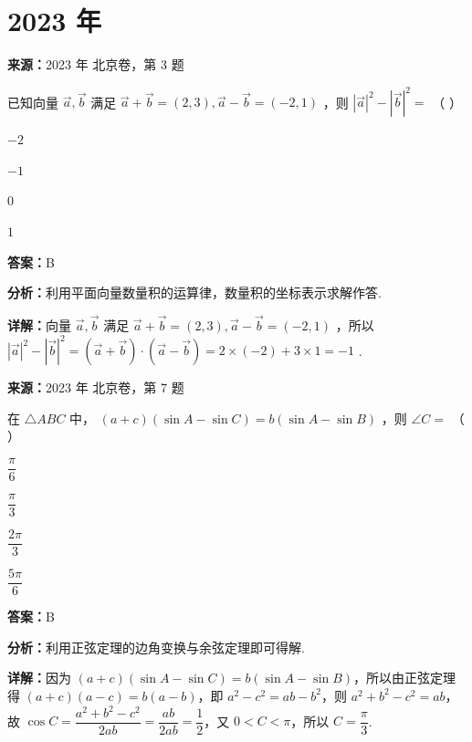 \section*{2023 年}

\begin{question}[points=4]
\textbf{来源：}2023 年 北京卷，第 3 题\par
已知向量 $\vec{a}, \vec{b}$ 满足 $\vec{a} + \vec{b} = (2,3), \vec{a} - \vec{b} = (-2,1)$ ，则 $|\vec{a}|^2 - |\vec{b}|^2 =$ （ ）
\begin{choices}
  \item $-2$
  \item $-1$
  \item $0$
  \item $1$
\end{choices}
\begin{solution}
\textbf{答案：}B

\textbf{分析：}利用平面向量数量积的运算律，数量积的坐标表示求解作答.

\textbf{详解：}向量 $\vec{a}, \vec{b}$ 满足 $\vec{a} + \vec{b} = (2,3), \vec{a} - \vec{b} = (-2,1)$ ，所以 $|\vec{a}|^2 - |\vec{b}|^2 = (\vec{a}+\vec{b})\cdot(\vec{a}-\vec{b}) = 2\times(-2) + 3\times1 = -1$ .
\end{solution}
\end{question}

\begin{question}[points=4]
\textbf{来源：}2023 年 北京卷，第 7 题\par
在 $\triangle ABC$ 中， $(a+c)(\sin A - \sin C) = b(\sin A - \sin B)$ ，则 $\angle C =$ （ ）
\begin{choices}
  \item $\dfrac{\pi}{6}$
  \item $\dfrac{\pi}{3}$
  \item $\dfrac{2\pi}{3}$
  \item $\dfrac{5\pi}{6}$
\end{choices}
\begin{solution}
\textbf{答案：}B

\textbf{分析：}利用正弦定理的边角变换与余弦定理即可得解.

\textbf{详解：}因为 $(a+c)(\sin A - \sin C) = b(\sin A - \sin B)$，所以由正弦定理得 $(a+c)(a-c) = b(a-b)$，即 $a^2 - c^2 = ab - b^2$，则 $a^2 + b^2 - c^2 = ab$，故 $\cos C = \dfrac{a^2+b^2-c^2}{2ab} = \dfrac{ab}{2ab} = \dfrac{1}{2}$，又 $0 < C < \pi$，所以 $C = \dfrac{\pi}{3}$.
\end{solution}
\end{question}

